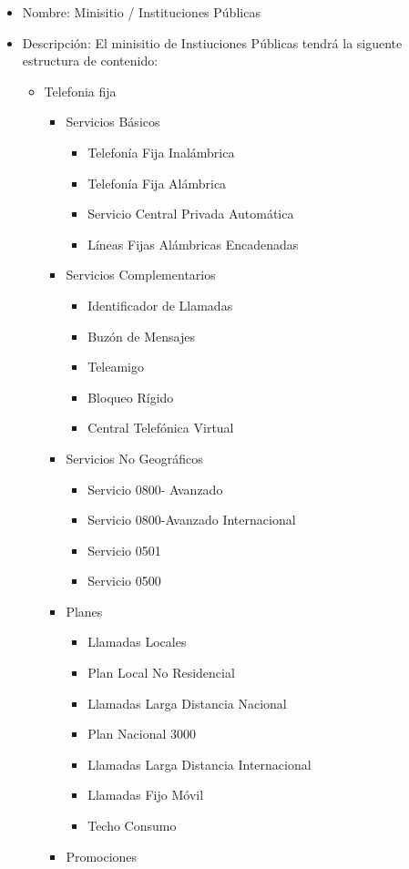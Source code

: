 \documentclass[11pt, letterpaper, oneside, spanish]{scrbook}
\begin{document}
\begin{itemize}
\item Nombre: Minisitio / Instituciones Públicas
\item Descripción: El minisitio de Instiuciones Públicas tendrá la siguente estructura de contenido:
\begin{itemize}
\item Telefonia fija
\begin{itemize}
\item Servicios Básicos
\begin{itemize}
\item Telefonía Fija Inalámbrica
\item Telefonía Fija Alámbrica
\item Servicio Central Privada Automática
\item Líneas Fijas Alámbricas Encadenadas
\end{itemize}
\item Servicios Complementarios
\begin{itemize}
\item Identificador de Llamadas
\item Buzón de Mensajes
\item Teleamigo
\item Bloqueo Rígido
\item Central Telefónica Virtual
\end{itemize}
\item Servicios No Geográficos
\begin{itemize}
\item Servicio 0800- Avanzado
\item Servicio 0800-Avanzado Internacional
\item Servicio 0501
\item Servicio 0500
\end{itemize}
\item Planes
\begin{itemize}
\item Llamadas Locales
\item Plan Local No Residencial
\item Llamadas Larga Distancia Nacional
\item Plan Nacional 3000
\item Llamadas Larga Distancia Internacional
\item Llamadas Fijo Móvil
\item Techo Consumo
\end{itemize}
\item Promociones

\end{itemize}
\end{itemize}
\end{itemize}
\end{document}

